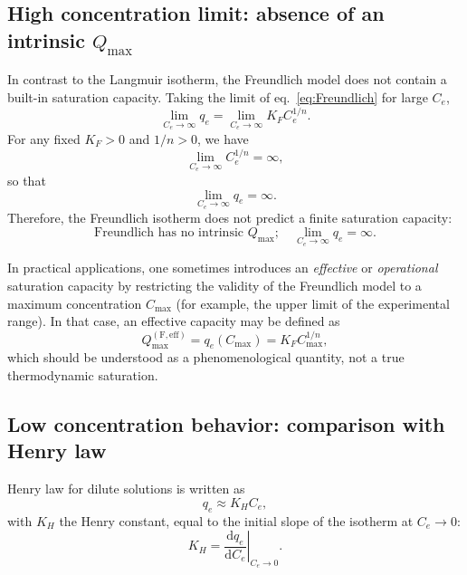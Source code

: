 	\subsection{High concentration limit: absence of an intrinsic \(Q_{\max}\)}
	
	In contrast to the Langmuir isotherm, the Freundlich model does not
	contain a built-in saturation capacity. Taking the limit of
	eq.~\eqref{eq:Freundlich} for large \(C_e\),
	\begin{equation}
		\lim_{C_e \to \infty} q_e
		= \lim_{C_e \to \infty} K_F C_e^{1/n}.
	\end{equation}
	For any fixed \(K_F > 0\) and \(1/n > 0\), we have
	\begin{equation}
		\lim_{C_e \to \infty} C_e^{1/n} = \infty,
	\end{equation}
	so that
	\begin{equation}
		\lim_{C_e \to \infty} q_e = \infty.
	\end{equation}
	Therefore, the Freundlich isotherm does not predict a finite
	saturation capacity:
	\begin{equation}
		\boxed{
			\text{Freundlich has no intrinsic } Q_{\max};
			\quad
			\lim_{C_e \to \infty} q_e = \infty.
		}
	\end{equation}
	
	In practical applications, one sometimes introduces an
	\emph{effective} or \emph{operational} saturation capacity by
	restricting the validity of the Freundlich model to a maximum
	concentration \(C_{\max}\) (for example, the upper limit of the
	experimental range). In that case, an effective capacity may be
	defined as
	\begin{equation}
		Q_{\max}^{\mathrm{(F,eff)}} = q_e(C_{\max})
		= K_F C_{\max}^{1/n},
	\end{equation}
	which should be understood as a phenomenological quantity, not
	a true thermodynamic saturation.
	
	\subsection{Low concentration behavior: comparison with Henry law}
	
	Henry law for dilute solutions is written as
	\begin{equation}
		q_e \approx K_H C_e,
		\label{eq:Henry}
	\end{equation}
	with \(K_H\) the Henry constant, equal to the initial slope of the
	isotherm at \(C_e \to 0\):
	\begin{equation}
		K_H = \left. \frac{\mathrm{d} q_e}{\mathrm{d} C_e}\right|_{C_e \to 0}.
	\end{equation}
	
